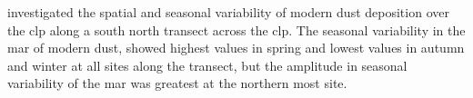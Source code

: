 \textcite{sun2003seasonal} investigated the spatial and seasonal variability of modern dust deposition over the \acrshort{clp} along a south north transect across the \acrshort{clp}. 
The seasonal variability in the \acrshort{mar} of modern dust, showed highest values in spring and lowest values in autumn and winter at all sites along the transect, but the amplitude in seasonal variability of the \acrshort{mar} was greatest at the northern most site.  

